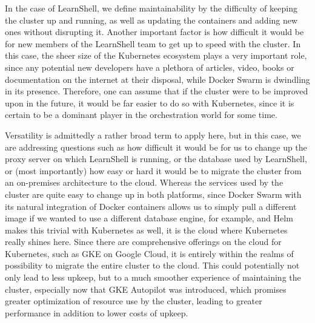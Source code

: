 \documentclass[thesis=B,english]{FITthesis}[2019/12/23]
\begin{document}
In the case of LearnShell, we define maintainability by the difficulty of keeping the cluster up and running, as well as updating the containers and adding new ones without disrupting it. Another important factor is how difficult it would be for new members of the LearnShell team to get up to speed with the cluster. In this case, the sheer size of the Kubernetes ecosystem plays a very important role, since any potential new developers have a plethora of articles, video, books or documentation on the internet at their disposal, while Docker Swarm is dwindling in its presence. Therefore, one can assume that if the cluster were to be improved upon in the future, it would be far easier to do so with Kubernetes, since it is certain to be a dominant player in the orchestration world for some time.

Versatility is admittedly a rather broad term to apply here, but in this case, we are addressing questions such as how difficult it would be for us to change up the proxy server on which LearnShell is running, or the database used by LearnShell, or (most importantly) how easy or hard it would be to migrate the cluster from an on-premises architecture to the cloud. Whereas the services used by the cluster are quite easy to change up in both platforms, since Docker Swarm with its natural integration of Docker containers allows us to simply pull a different image if we wanted to use a different database engine, for example, and Helm makes this trivial with Kubernetes as well, it is the cloud where Kubernetes really shines here. Since there are comprehensive offerings on the cloud for Kubernetes, such as GKE on Google Cloud, it is entirely within the realms of possibility to migrate the entire cluster to the cloud. This could potentially not only lead to less upkeep, but to a much smoother experience of maintaining the cluster, especially now that GKE Autopilot was introduced, which promises greater optimization of resource use by the cluster, leading to greater performance in addition to lower costs of upkeep. \cite{autopilot}
\end{document}
